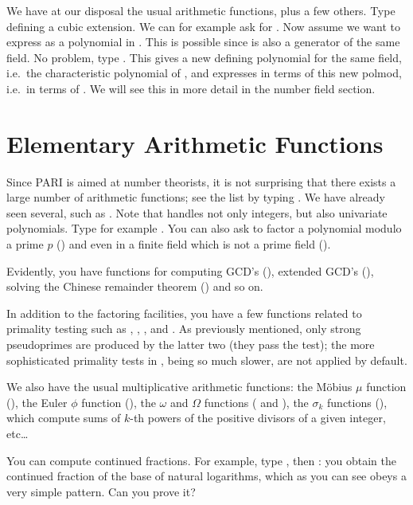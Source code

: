 We have at our disposal the usual arithmetic functions, plus a few others.
Type  defining a cubic extension. We can for
example ask for . Now assume we want to express 
as a polynomial in . This is possible since  is also a
generator of the same field. No problem, type . This gives
a new defining polynomial for the same field, i.e.~the characteristic
polynomial of , and expresses  in terms of this new polmod,
i.e.~in terms of . We will see this in more detail in the number
field section.

\section{Elementary Arithmetic Functions}

Since PARI is aimed at number theorists, it is not surprising that there
exists a large number of arithmetic functions; see the list by typing
. We have already seen several, such as . Note that
 handles not only integers, but also univariate polynomials.
Type for example . You can also ask to factor a
polynomial modulo a prime $p$ () and even in a finite field
which is not a prime field ().

Evidently, you have functions for computing GCD's (), extended GCD's
(), solving the Chinese remainder theorem () and so
on.

In addition to the factoring facilities, you have a few functions related to
primality testing such as , ,
, and . As previously mentioned, only strong
pseudoprimes are produced by the latter two (they pass the
 test); the more sophisticated primality tests in
, being so much slower, are not applied by default.

We also have the usual multiplicative arithmetic functions: the M\"obius $\mu$
function (), the Euler $\phi$ function (), the
$\omega$ and $\Omega$ functions ( and ), the
$\sigma_k$ functions (), which compute sums of $k$-th powers of the
positive divisors of a given integer, etc\dots

You can compute continued fractions. For example, type , then
: you obtain the continued fraction of the base of
natural logarithms, which as you can see obeys a very simple pattern. Can
you prove it?


